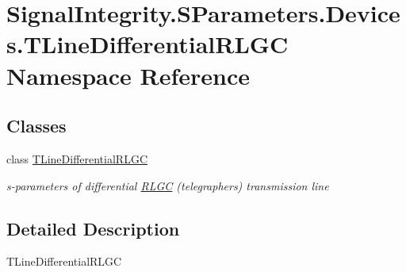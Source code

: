 \hypertarget{namespaceSignalIntegrity_1_1SParameters_1_1Devices_1_1TLineDifferentialRLGC}{}\section{Signal\+Integrity.\+S\+Parameters.\+Devices.\+T\+Line\+Differential\+R\+L\+GC Namespace Reference}
\label{namespaceSignalIntegrity_1_1SParameters_1_1Devices_1_1TLineDifferentialRLGC}
\subsection*{Classes}
\begin{DoxyCompactItemize}
\item 
class \hyperlink{classSignalIntegrity_1_1SParameters_1_1Devices_1_1TLineDifferentialRLGC_1_1TLineDifferentialRLGC}{T\+Line\+Differential\+R\+L\+GC}
\begin{DoxyCompactList}\small\item\em s-\/parameters of differential \hyperlink{namespaceSignalIntegrity_1_1SParameters_1_1RLGC}{R\+L\+GC} (telegrapher\textquotesingle{}s) transmission line \end{DoxyCompactList}\end{DoxyCompactItemize}


\subsection{Detailed Description}
\begin{DoxyVerb}TLineDifferentialRLGC\end{DoxyVerb}
 